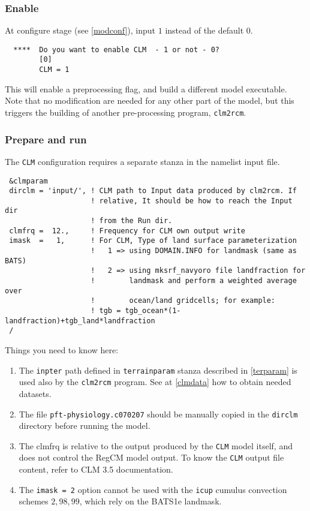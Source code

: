 \subsubsection{Enable}

At configure stage (see \ref{modconf}), input $1$ instead of the default $0$.

\begin{Verbatim}
  ****  Do you want to enable CLM  - 1 or not - 0?
        [0]
        CLM = 1
\end{Verbatim}

This will enable a preprocessing flag, and build a different model executable.
Note that no modification are needed for any other part of the model, but
this triggers the building of another pre-processing program, \verb=clm2rcm=.

\subsubsection{Prepare and run}
\label{clmrun}

The \verb=CLM= configuration requires a separate stanza in the namelist input
file.

{\footnotesize
\begin{Verbatim}
 &clmparam
 dirclm = 'input/', ! CLM path to Input data produced by clm2rcm. If 
                    ! relative, It should be how to reach the Input dir
                    ! from the Run dir.
 clmfrq =  12.,     ! Frequency for CLM own output write
 imask  =   1,      ! For CLM, Type of land surface parameterization
                    !   1 => using DOMAIN.INFO for landmask (same as BATS)
                    !   2 => using mksrf_navyoro file landfraction for
                    !        landmask and perform a weighted average over
                    !        ocean/land gridcells; for example:
                    ! tgb = tgb_ocean*(1-landfraction)+tgb_land*landfraction
 /
\end{Verbatim}
}

Things you need to know here:

\begin{enumerate}
\item The \verb=inpter= path defined in \verb=terrainparam= stanza described in
\ref{terparam} is used also by the \verb=clm2rcm= program. See at \ref{clmdata}
how to obtain needed datasets.
\item The file \verb=pft-physiology.c070207= should be manually copied in the
\verb=dirclm= directory before running the model.
\item The clmfrq is relative to the output produced by the \verb=CLM= model
itself, and does not control the RegCM model output. To know the \verb=CLM=
output file content, refer to CLM 3.5 documentation.
\item The \verb'imask = 2' option cannot be used with the \verb'icup'
cumulus convection schemes $2, 98, 99$, which rely on the BATS1e landmask.
\end{enumerate}

